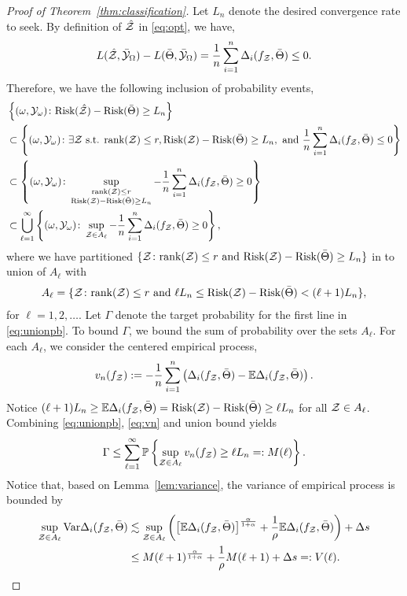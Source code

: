 \documentclass[twoside,11pt]{article}
\theoremstyle{plain}
\theoremstyle{definition}
\def\risk{\textup{Risk}}
\begin{document}
\begin{proof}[Proof of Theorem~\ref{thm:classification}]
Let $L_n$ denote the desired convergence rate to seek. By definition of $\hat {\mathcal{Z}}$ in \eqref{eq:opt}, we have, 
\[ L(\hat {\mathcal{Z}},\bar {\mathcal{Y}}_\Omega)-L(\bar \Theta,\bar {\mathcal{Y}}_\Omega) = \frac{1}{n}\sum_{i=1}^n\Delta_i(f_{\mathcal{Z}},\bar \Theta)\leq 0.\]
Therefore, we have the following inclusion of probability events,
\begin{align}\label{eq:unionpb}
&\left\{(\omega,\tY_{\omega})\colon \risk(\hat \tZ)-\risk(\bar\Theta)\geq L_n \right\}\nonumber\\
&\subset\left\{(\omega,\tY_{\omega})\colon\exists \tZ \text{ s.t. } \text{rank}(\tZ)\leq r,  \risk(\tZ)-\risk(\bar\Theta)\geq L_n, \text{ and } \frac{1}{n}\sum_{i=1}^n\Delta_i(f_\tZ,\bar \Theta)\leq 0 \right\}\nonumber\\
&\subset \left\{(\omega,\tY_{\omega})\colon\sup_{\substack{\text{rank}(\tZ)\leq r\\  
\risk(\tZ)-\risk(\bar\Theta)\geq L_n  }}-\frac{1}{n}\sum_{i=1}^n\Delta_i(f_\tZ,\bar \Theta)\geq 0\right\}\nonumber\\
&\subset \bigcup_{\ell=1}^{\infty}\left\{(\omega,\tY_\omega)\colon \sup_{\tZ\in A_{\ell}}-\frac{1}{n}\sum_{i=1}^n\Delta_i(f_\tZ,\bar \Theta)\geq 0\right\},
\end{align}
where we have partitioned $\{\tZ\colon \text{rank}(\tZ)\leq r \text{ and } \risk(\tZ)-\risk(\bar\Theta)\geq L_n\}$ in to union of $A_{\ell}$ with 
\begin{align}
A_{\ell} = \{\tZ\colon \text{rank}(\tZ)\leq r \text{ and } \ell L_n\leq  \risk(\tZ)-\risk(\bar\Theta)<(\ell+1)L_n\},
\end{align}
for $\ell = 1,2,\ldots$. Let $\Gamma$ denote the target probability for the first line in \eqref{eq:unionpb}. To bound $\Gamma$, we bound the sum of probability over the sets $A_{\ell}$.   For each $A_{\ell}$, we consider the centered empirical process,
\begin{align}\label{eq:vn}
v_n(f_{\mathcal{Z}}) := -\frac{1}{n}\sum_{i=1}^n \left(\Delta_i(f_{\mathcal{Z}},\bar \Theta)- \mathbb{E}\Delta_i(f_{\mathcal{Z}},\bar \Theta)\right).
\end{align}
Notice $(\ell+1)L_n\geq \mathbb{E}\Delta_i(f_\tZ,\bar \Theta) =\risk	(\tZ)-\risk(\bar\Theta)\geq \ell L_n$ for all $\mathcal{Z}\in A_{\ell}$.  Combining \eqref{eq:unionpb},  \eqref{eq:vn} and union bound yields
\begin{align}\label{eq:gammabd}
\Gamma\leq \sum_{\ell=1}^\infty\mathbb{P}\left\{\sup_{\mathcal{Z}\in A_{\ell}} v_n(f_{\mathcal{Z}})\geq  \ell L_n=:M(\ell) \right\}.
\end{align}
Notice that, based on Lemma~\ref{lem:variance}, the variance of empirical process is bounded by 
\begin{align}
\sup_{\mathcal{Z}\in A_{\ell}}\textup{Var}\Delta_i(f_{\mathcal{Z}},\bar \Theta)& \lesssim \sup_{\mathcal{Z}\in A_{\ell}}\left( \left[\mathbb{E}\Delta_i(f_{\mathcal{Z}},\bar \Theta)\right]^{\alpha \over 1+\alpha}+{1\over \rho}\mathbb{E}\Delta_i(f_{\mathcal{Z}},\bar \Theta)\right)+\Delta s \\&\leq M(\ell+1)^{\alpha\over 1+\alpha}+\frac{1}{\rho}M(\ell+1) +\Delta s =: V(\ell).
\end{align}


\end{proof}
\end{document}
